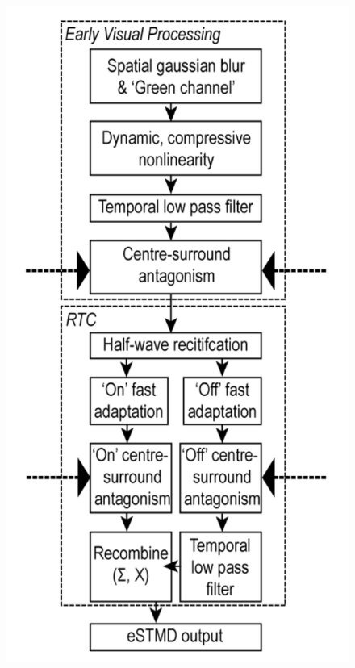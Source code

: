 \documentclass[a4paper,11pt]{article}
\begin{document}
\begin{figure}[h]
\centering
\includegraphics[scale = 0.5]{wiederman09}
\caption{\cite{Wiederman2008}}
\end{figure}
\end{document}
